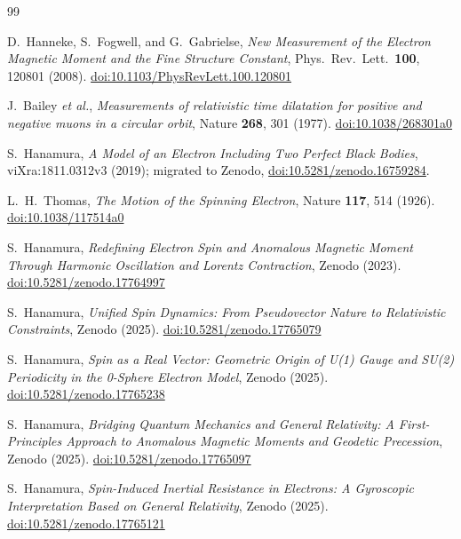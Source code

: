 \documentclass[%
 reprint, amsmath,amssymb, aps, prb, ]{revtex4-2}
\numberwithin{equation}{section}
\begin{document}
\begin{thebibliography}{99}

D.~Hanneke, S.~Fogwell, and G.~Gabrielse,
\textit{New Measurement of the Electron Magnetic Moment and the Fine Structure Constant},
Phys.\ Rev.\ Lett.\ \textbf{100}, 120801 (2008).
\href{https://doi.org/10.1103/PhysRevLett.100.120801}{doi:10.1103/PhysRevLett.100.120801}

J.~Bailey \textit{et al.},
\textit{Measurements of relativistic time dilatation for positive and negative muons in a circular orbit},
Nature \textbf{268}, 301 (1977).
\href{https://doi.org/10.1038/268301a0}{doi:10.1038/268301a0}

S.~Hanamura,
\textit{A Model of an Electron Including Two Perfect Black Bodies},
viXra:1811.0312v3 (2019); migrated to Zenodo,
\href{https://doi.org/10.5281/zenodo.16759284}{doi:10.5281/zenodo.16759284}.

L.~H.~Thomas,
\textit{The Motion of the Spinning Electron},
Nature \textbf{117}, 514 (1926).
\href{https://doi.org/10.1038/117514a0}{doi:10.1038/117514a0}

S.~Hanamura,
\textit{Redefining Electron Spin and Anomalous Magnetic Moment Through Harmonic Oscillation and Lorentz Contraction},
Zenodo (2023).
\href{https://doi.org/10.5281/zenodo.17764997}{doi:10.5281/zenodo.17764997}

S.~Hanamura,
\textit{Unified Spin Dynamics: From Pseudovector Nature to Relativistic Constraints},
Zenodo (2025).
\href{https://doi.org/10.5281/zenodo.17765079}{doi:10.5281/zenodo.17765079}

S.~Hanamura,
\textit{Spin as a Real Vector: Geometric Origin of U(1) Gauge and SU(2) Periodicity
in the 0-Sphere Electron Model},
Zenodo (2025).
\href{https://doi.org/10.5281/zenodo.17765238}{doi:10.5281/zenodo.17765238}

S.~Hanamura,
\textit{Bridging Quantum Mechanics and General Relativity: A First-Principles Approach
to Anomalous Magnetic Moments and Geodetic Precession},
Zenodo (2025).
\href{https://doi.org/10.5281/zenodo.17765097}{doi:10.5281/zenodo.17765097}

S.~Hanamura,
\textit{Spin-Induced Inertial Resistance in Electrons:
A Gyroscopic Interpretation Based on General Relativity},
Zenodo (2025).
\href{https://doi.org/10.5281/zenodo.17765121}{doi:10.5281/zenodo.17765121}


\end{thebibliography}
\end{document}

